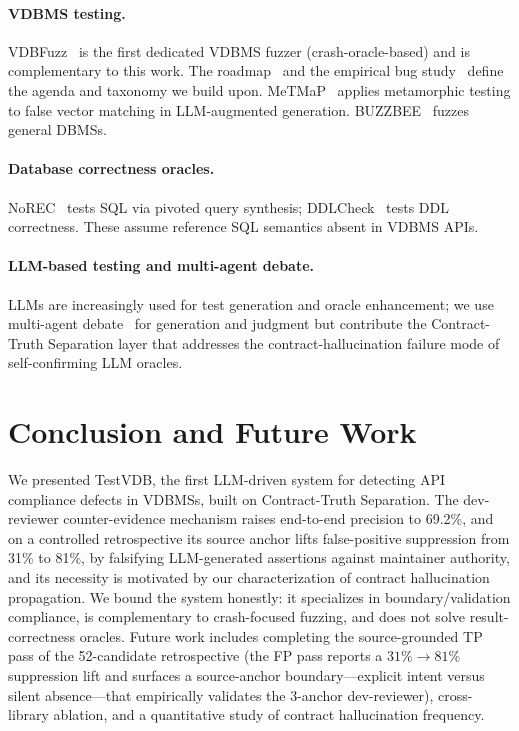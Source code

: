 \documentclass[sigconf, anonymous, review]{acmart}
\begin{document}
\paragraph{VDBMS testing.} VDBFuzz~\cite{vdbfuzz26} is the first dedicated VDBMS fuzzer (crash-oracle-based) and is complementary to this work. The roadmap~\cite{roadmap25} and the empirical bug study~\cite{bugstudy25} define the agenda and taxonomy we build upon. MeTMaP~\cite{metmap24} applies metamorphic testing to false vector matching in LLM-augmented generation. BUZZBEE~\cite{buzzbee24} fuzzes general DBMSs.
\paragraph{Database correctness oracles.} NoREC~\cite{norec20} tests SQL via pivoted query synthesis; DDLCheck~\cite{ddlcheck25} tests DDL correctness. These assume reference SQL semantics absent in VDBMS APIs.
\paragraph{LLM-based testing and multi-agent debate.} LLMs are increasingly used for test generation and oracle enhancement; we use multi-agent debate~\cite{du2023improving} for generation and judgment but contribute the Contract-Truth Separation layer that addresses the contract-hallucination failure mode of self-confirming LLM oracles.

\section{Conclusion and Future Work}\label{sec:conc}
We presented TestVDB, the first LLM-driven system for detecting API compliance defects in VDBMSs, built on Contract-Truth Separation. The dev-reviewer counter-evidence mechanism raises end-to-end precision to 69.2\%, and on a controlled retrospective its source anchor lifts false-positive suppression from 31\% to 81\%, by falsifying LLM-generated assertions against maintainer authority, and its necessity is motivated by our characterization of contract hallucination propagation. We bound the system honestly: it specializes in boundary/validation compliance, is complementary to crash-focused fuzzing, and does not solve result-correctness oracles. Future work includes completing the source-grounded TP pass of the 52-candidate retrospective (the FP pass reports a $31\%{\to}81\%$ suppression lift and surfaces a source-anchor boundary---explicit intent versus silent absence---that empirically validates the 3-anchor dev-reviewer), cross-library ablation, and a quantitative study of contract hallucination frequency.



\end{document}
